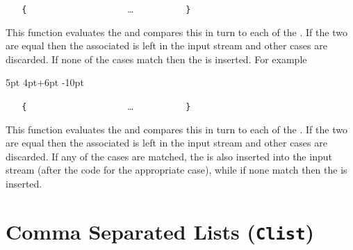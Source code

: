 \documentclass[oneside]{book}
\begin{document}
\begin{function}{\DimCaseF}
\begin{syntax}
 
~ ~ \verb|{|
~ ~ ~ ~  
~ ~ ~ ~   
~ ~ ~ ~ \ldots
~ ~ ~ ~  
~ ~ \verb|}|
~ ~ 
\end{syntax}
This function evaluates the  and
compares this in turn to each of the
. If the two are equal then the
associated  is left in the input stream
and other cases are discarded. If none of the cases
match then the  is inserted.
For example
\begin{demohigh}
\IgnoreSpacesOn
\DimSet \lTmpaDim {5pt}
\DimCaseF {2\lTmpaDim} {
  {5pt}     {}
  {4pt+6pt} {}
  {-10pt}   {}
}{
}
\IgnoreSpacesOff
\end{demohigh}
\end{function}

\begin{function}{\DimCaseTF}
\begin{syntax}
 
~ ~ \verb|{|
~ ~ ~ ~  
~ ~ ~ ~   
~ ~ ~ ~ \ldots
~ ~ ~ ~  
~ ~ \verb|}|
~ ~ 
~ ~ 
\end{syntax}
This function evaluates the  and
compares this in turn to each of the
. If the two are equal then the
associated  is left in the input stream
and other cases are discarded. If any of the
cases are matched, the  is also inserted into the
input stream (after the code for the appropriate case), while if none
match then the  is inserted.
\end{function}

\chapter{Comma Separated Lists (\texttt{Clist})}
\end{document}
